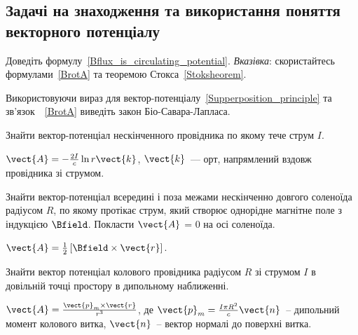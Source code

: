 \subsection*{Задачі на знаходження та використання поняття векторного потенціалу}

\begin{problem}
    Доведіть формулу~\ref{Bflux_is_circulating_potential}.
	\emph{Вказівка}: скористайтесь формулами~\eqref{BrotA} та теоремою Стокса~\eqref{Stoksheorem}.
\end{problem}

\begin{problem}
    Використовуючи вираз для вектор-потенціалу~\eqref{Supperposition_principle} та зв'язок~~\eqref{BrotA} виведіть закон Біо-Савара-Лапласа.
\end{problem}



\begin{problem}
Знайти вектор-потенціал нескінченного провідника по якому тече струм $I$.
\begin{solution}
	$\vect{A} =-  \frac{2I}{c}\ln r \vect{k}$, $\vect{k}$~--- орт, напрямлений вздовж провідника зі струмом.
\end{solution}
\end{problem}

\begin{problem}
Знайти вектор-потенціал всередині і поза межами нескінченно довгого  соленоїда радіусом $R$, по якому протікає струм, який створює  однорідне магнітне поле з індукцією $\Bfield$. Покласти $\vect{A}$ = 0 на осі соленоїда.
\begin{solution}
	$\vect{A} = \frac12 \left[ \Bfield\times \vect{r} \right] $.
\end{solution}
\end{problem}

\begin{problem}
    Знайти вектор потенціал колового провідника радіусом $R$ зі струмом $I$ в довільній точці простору в дипольному наближенні.
\begin{solution}
	$\vect{A} = \frac{\vect{p}_m\times\vect{r}}{r^3}$, де $\vect{p}_m = \frac{I\pi R^2}{c}\vect{n}$~-- дипольний момент колового витка, $\vect{n}$~-- вектор нормалі до поверхні витка.
\end{solution}
\end{problem}


